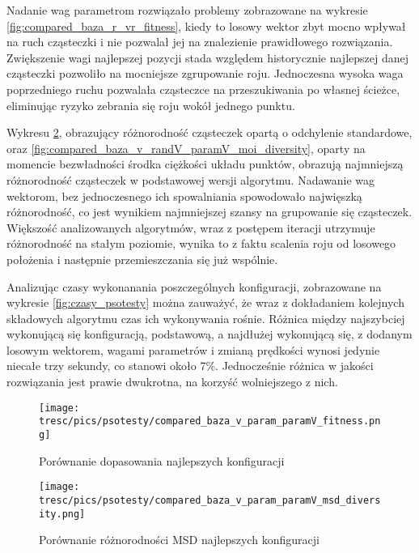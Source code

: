 Nadanie wag parametrom rozwiązało problemy zobrazowane na wykresie \ref{fig:compared_baza_r_vr_fitness}, kiedy to losowy wektor zbyt mocno wpływał na ruch cząsteczki i nie pozwalał jej na znalezienie prawidłowego rozwiązania. Zwiększenie wagi najlepszej pozycji stada względem historycznie najlepszej danej cząsteczki pozwoliło na mocniejsze zgrupowanie roju. Jednoczesna wysoka waga poprzedniego ruchu pozwalała cząsteczce na przeszukiwania po własnej ścieżce, eliminując ryzyko zebrania się roju wokół jednego punktu.

Wykresu \ref{fig:compared_baza_v_randV_paramV_msd_diversity}, obrazujący różnorodność cząsteczek opartą o odchylenie standardowe, oraz \ref{fig:compared_baza_v_randV_paramV_moi_diversity}, oparty na momencie bezwładności środka ciężkości układu punktów, obrazują najmniejszą różnorodność cząsteczek w podstawowej wersji algorytmu. Nadawanie wag wektorom, bez jednoczesnego ich spowalniania spowodowało najwięszką różnorodność, co jest wynikiem najmniejszej szansy na grupowanie się cząsteczek. Większość analizowanych algorytmów, wraz z postępem iteracji utrzymuje różnorodność na stałym poziomie, wynika to z faktu scalenia roju od losowego położenia i następnie przemieszczania się już wspólnie.

Analizując czasy wykonanania poszczególnych konfiguracji, zobrazowane na wykresie \ref{fig:czasy_psotesty} można zauważyć, że wraz z dokładaniem kolejnych składowych algorytmu czas ich wykonywania rośnie. Różnica między najszybciej wykonującą się konfiguracją, podstawową, a najdłużej wykonującą się, z dodanym losowym wektorem, wagami parametrów i zmianą prędkości wynosi jedynie niecałe trzy sekundy, co stanowi około 7\%. Jednocześnie różnica w jakości rozwiązania jest prawie dwukrotna, na korzyść wolniejszego z nich.

\begin{figure}[H]
\begin{center} 
\texttt{[image: tresc/pics/psotesty/compared\_baza\_v\_param\_paramV\_fitness.png]}
\caption{Porównanie dopasowania najlepszych konfiguracji}
\label{fig:compared_baza_v_randV_paramV_fitness}
\end{center}
\end{figure}

\clearpage

\begin{figure}[H]
\begin{center} 
\texttt{[image: tresc/pics/psotesty/compared\_baza\_v\_param\_paramV\_msd\_diversity.png]}
\caption{Porównanie różnorodności MSD najlepszych konfiguracji}
\label{fig:compared_baza_v_randV_paramV_msd_diversity}
\end{center}
\end{figure}

